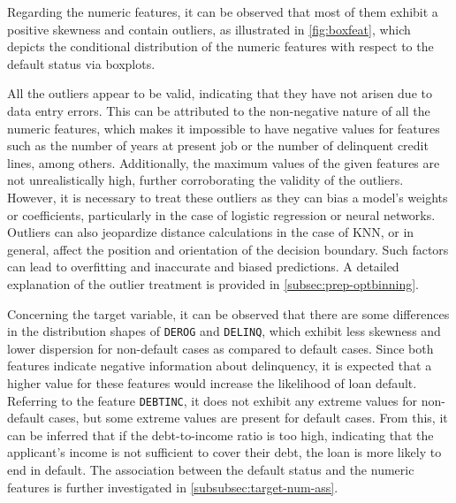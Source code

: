 Regarding the numeric features, it can be observed that most of them exhibit a positive skewness and contain outliers, as illustrated in \autoref{fig:boxfeat}, which depicts the conditional distribution of the numeric features with respect to the default status via boxplots.

All the outliers appear to be valid, indicating that they have not arisen due to data entry errors.
This can be attributed to the non-negative nature of all the numeric features, which makes it impossible to have negative values for features such as the number of years at present job or the number of delinquent credit lines, among others.
Additionally, the maximum values of the given features are not unrealistically high, further corroborating the validity of the outliers.
However, it is necessary to treat these outliers as they can bias a model's weights or coefficients, particularly in the case of logistic regression or neural networks.
Outliers can also jeopardize distance calculations in the case of KNN, or in general, affect the position and orientation of the decision boundary.
Such factors can lead to overfitting and inaccurate and biased predictions.
A detailed explanation of the outlier treatment is provided in \autoref{subsec:prep-optbinning}.

Concerning the target variable, it can be observed that there are some differences in the distribution shapes of \texttt{DEROG} and \texttt{DELINQ}, which exhibit less skewness and lower dispersion for non-default cases as compared to default cases.
Since both features indicate negative information about delinquency, it is expected that a higher value for these features would increase the likelihood of loan default.
Referring to the feature \texttt{DEBTINC}, it does not exhibit any extreme values for non-default cases, but some extreme values are present for default cases.
From this, it can be inferred that if the debt-to-income ratio is too high, indicating that the applicant's income is not sufficient to cover their debt, the loan is more likely to end in default.
The association between the default status and the numeric features is further investigated in \autoref{subsubsec:target-num-ass}.


